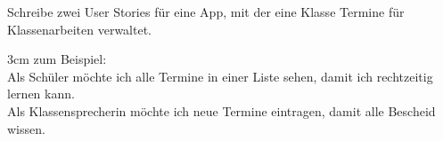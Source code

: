 \question[3]
Schreibe zwei User Stories für eine App, mit der eine Klasse Termine für Klassenarbeiten verwaltet.
\begin{solutionbox}{3cm}
zum Beispiel: \\
Als Schüler möchte ich alle Termine in einer Liste sehen, damit ich rechtzeitig lernen kann. \\
Als Klassensprecherin möchte ich neue Termine eintragen, damit alle Bescheid wissen.
\end{solutionbox}
